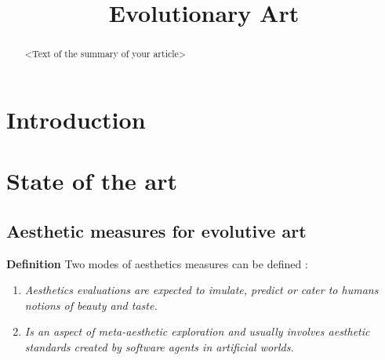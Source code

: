 \documentclass{llncs}
\title{Evolutionary Art}
\author{}
\begin{document}
\maketitle

\begin{abstract}
<Text of the summary of your article>
\end{abstract}

\section{Introduction}

\section{State of the art}

\subsection{Aesthetic measures for evolutive art}

{\bf Definition} Two modes of aesthetics measures can be defined \cite{galanter2012computational}: 

\begin{enumerate}
\item {\em Aesthetics evaluations are expected to imulate, predict or cater to humans notions of beauty and taste.} 
\item {\em Is an aspect of meta-aesthetic exploration and usually involves aesthetic standards created by software agents in artificial worlds.}
\end{enumerate}
\end{document}
